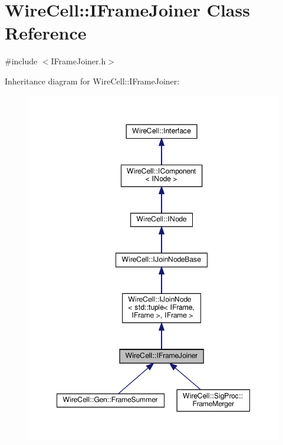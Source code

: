 \hypertarget{class_wire_cell_1_1_i_frame_joiner}{}\section{Wire\+Cell\+:\+:I\+Frame\+Joiner Class Reference}
\label{class_wire_cell_1_1_i_frame_joiner}


{\ttfamily \#include $<$I\+Frame\+Joiner.\+h$>$}



Inheritance diagram for Wire\+Cell\+:\+:I\+Frame\+Joiner\+:
\nopagebreak
\begin{figure}[H]
\begin{center}
\leavevmode
\includegraphics[width=348pt]{class_wire_cell_1_1_i_frame_joiner__inherit__graph}
\end{center}
\end{figure}


